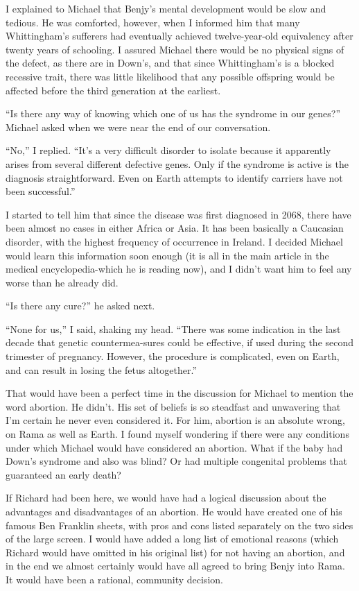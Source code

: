 \documentclass[]{article}
\begin{document}
I explained to Michael that Benjy’s mental development would be slow and tedious. He was comforted, however, when I informed him that many Whittingham’s sufferers had eventually achieved twelve-year-old equivalency after twenty years of schooling. I assured Michael there would be no physical signs of the defect, as there are in Down’s, and that since Whittingham’s is a blocked recessive trait, there was little likelihood that any possible offspring would be affected before the third generation at the earliest.

“Is there any way of knowing which one of us has the syndrome in our genes?” Michael asked when we were near the end of our conversation.

“No,” I replied. “It’s a very difficult disorder to isolate because it apparently arises from several different defective genes. Only if the syndrome is active is the diagnosis straightforward. Even on Earth attempts to identify carriers have not been successful.”

I started to tell him that since the disease was first diagnosed in 2068, there have been almost no cases in either Africa or Asia. It has been basically a Caucasian disorder, with the highest frequency of occurrence in Ireland. I decided Michael would learn this information soon enough (it is all in the main article in the medical encyclopedia-which he is reading now), and I didn’t want him to feel any worse than he already did.

“Is there any cure?” he asked next.

“None for us,” I said, shaking my head. “There was some indication in the last decade that genetic countermea-sures could be effective, if used during the second trimester of pregnancy. However, the procedure is complicated, even on Earth, and can result in losing the fetus altogether.”

That would have been a perfect time in the discussion for Michael to mention the word abortion. He didn’t. His set of beliefs is so steadfast and unwavering that I’m certain he never even considered it. For him, abortion is an absolute wrong, on Rama as well as Earth. I found myself wondering if there were any conditions under which Michael would have considered an abortion. What if the baby had Down’s syndrome and also was blind? Or had multiple congenital problems that guaranteed an early death?

If Richard had been here, we would have had a logical discussion about the advantages and disadvantages of an abortion. He would have created one of his famous Ben Franklin sheets, with pros and cons listed separately on the two sides of the large screen. I would have added a long list of emotional reasons (which Richard would have omitted in his original list) for not having an abortion, and in the end we almost certainly would have all agreed to bring Benjy into Rama. It would have been a rational, community decision.
\end{document}
